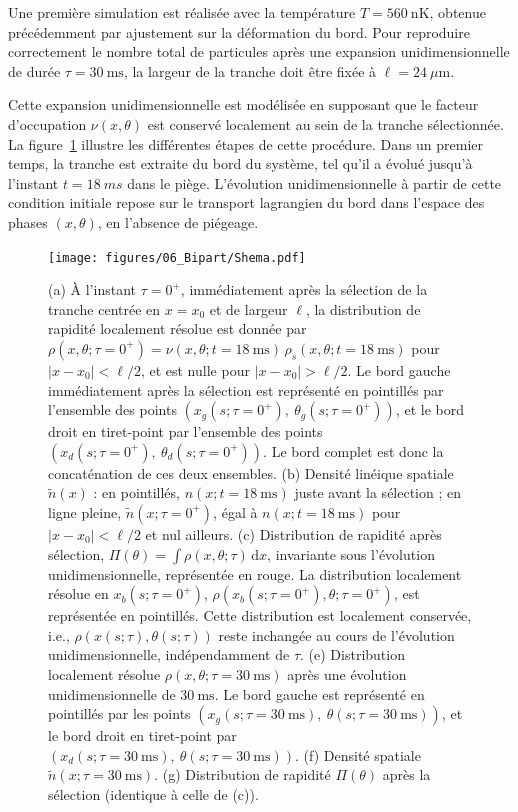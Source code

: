 \medskip

Une première simulation est réalisée avec la température \(T = 560~\mathrm{nK}\), obtenue précédemment par ajustement sur la déformation du bord.  
Pour reproduire correctement le nombre total de particules après une expansion unidimensionnelle de durée \(\tau = 30~\mathrm{ms}\), la largeur de la tranche doit être fixée à \(\ell = 24~\mu\mathrm{m}\). 

\medskip

Cette expansion unidimensionnelle est modélisée en supposant que le facteur d’occupation $\nu(x,\theta)$ est conservé localement au sein de la tranche sélectionnée. La figure~\ref{fig:BiPart.coupure2} illustre les différentes étapes de cette procédure.
Dans un premier temps, la tranche est extraite du bord du système, tel qu’il a évolué jusqu’à l’instant $t = 18~ms$ dans le piège. L’évolution unidimensionnelle à partir de cette condition initiale repose sur le transport lagrangien du bord dans l’espace des phases $(x,\theta)$, en l’absence de piégeage.

\begin{figure}[!htb]
	\centering
	\texttt{[image: figures/06\_Bipart/Shema.pdf]}
	\caption{
(a) À l'instant $\tau = 0^+$, immédiatement après la sélection de la tranche centrée en $x = x_0$ et de largeur $\ell$, la distribution de rapidité localement résolue est donnée par $\rho(x,\theta ; \tau = 0^+) = \nu(x, \theta ; t = 18~\mathrm{ms}) \, \rho_s(x,\theta ; t = 18~\mathrm{ms})$ pour $\vert x - x_0 \vert < \ell/2$, et est nulle pour $\vert x - x_0 \vert > \ell/2$. Le bord gauche immédiatement après la sélection est représenté en pointillés par l’ensemble des points $(x_g(s; \tau = 0^+),\ \theta_g(s; \tau = 0^+))$, et le bord droit en tiret-point par l’ensemble des points $(x_d(s; \tau = 0^+),\ \theta_d(s; \tau = 0^+))$. Le bord complet est donc la concaténation de ces deux ensembles. 
(b) Densité linéique spatiale $\tilde{n}(x)$ : en pointillés, $n(x; t = 18~\mathrm{ms})$ juste avant la sélection ; en ligne pleine, $\tilde{n}(x; \tau = 0^+)$, égal à $n(x; t = 18~\mathrm{ms})$ pour $\vert x - x_0 \vert < \ell/2$ et nul ailleurs. 
(c) Distribution de rapidité après sélection, $\Pi(\theta) = \int \rho(x,\theta ; \tau)\,\mathrm{d}x$, invariante sous l’évolution unidimensionnelle, représentée en rouge. La distribution localement résolue en $x_b(s; \tau = 0^+)$, $\rho(x_b(s; \tau = 0^+), \theta ; \tau = 0^+)$, est représentée en pointillés. Cette distribution est localement conservée, i.e., $\rho(x(s; \tau), \theta(s; \tau))$ reste inchangée au cours de l’évolution unidimensionnelle, indépendamment de $\tau$. 
(e) Distribution localement résolue $\rho(x, \theta ; \tau = 30~\mathrm{ms})$ après une évolution unidimensionnelle de $30~\mathrm{ms}$. Le bord gauche est représenté en pointillés par les points $(x_g(s; \tau = 30~\mathrm{ms}),\ \theta(s; \tau = 30~\mathrm{ms}))$, et le bord droit en tiret-point par $(x_d(s; \tau = 30~\mathrm{ms}),\ \theta(s; \tau = 30~\mathrm{ms}))$. 
(f) Densité spatiale $\tilde{n}(x; \tau = 30~\mathrm{ms})$. 
(g) Distribution de rapidité $\Pi(\theta)$ après la sélection (identique à celle de (c)).
}
	\label{fig:BiPart.coupure2}
	
\end{figure}


